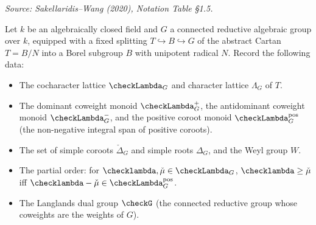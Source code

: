 \begin{definition}
  \label{def:reductive-group-data}
  \uses{}
  \textit{Source: Sakellaridis--Wang (2020), Notation Table §1.5.}

  Let \( k \) be an algebraically closed field and \( G \) a connected reductive algebraic
  group over \( k \), equipped with a fixed splitting
  \( T \hookrightarrow B \hookrightarrow G \)
  of the abstract Cartan \( T = B/N \) into a Borel subgroup \( B \) with unipotent radical
  \( N \).
  Record the following data:
  \begin{itemize}
    \item The cocharacter lattice \( \checkLambda_G \) and character lattice
          \( \Lambda_G \) of \( T \).
    \item The dominant coweight monoid \( \checkLambda_G^+ \), the antidominant coweight
          monoid \( \checkLambda_G^- \), and the positive coroot monoid
          \( \checkLambda_G^{\mathrm{pos}} \) (the non-negative integral span of positive
          coroots).
    \item The set of simple coroots \( \check\Delta_G \) and simple roots \( \Delta_G \),
          and the Weyl group \( W \).
    \item The partial order: for \( \checklambda, \check\mu \in \checkLambda_G \),
          \( \checklambda \ge \check\mu \) iff
          \( \checklambda - \check\mu \in \checkLambda_G^{\mathrm{pos}} \).
    \item The Langlands dual group \( \checkG \) (the connected reductive group whose
          coweights are the weights of \( G \)).
  \end{itemize}
\end{definition}

